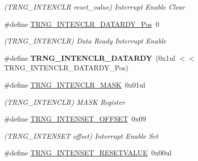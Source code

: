 \begin{DoxyCompactItemize}
\begin{DoxyCompactList}\small\item\em (T\+R\+N\+G\+\_\+\+I\+N\+T\+E\+N\+C\+L\+R reset\+\_\+value) Interrupt Enable Clear \end{DoxyCompactList}\item 
\hypertarget{group___s_a_m_l21___t_r_n_g_ga834c6df6c8e40b1c0e5215ede8b287ef}{}\#define \hyperlink{group___s_a_m_l21___t_r_n_g_ga834c6df6c8e40b1c0e5215ede8b287ef}{T\+R\+N\+G\+\_\+\+I\+N\+T\+E\+N\+C\+L\+R\+\_\+\+D\+A\+T\+A\+R\+D\+Y\+\_\+\+Pos}~0\label{group___s_a_m_l21___t_r_n_g_ga834c6df6c8e40b1c0e5215ede8b287ef}

\begin{DoxyCompactList}\small\item\em (T\+R\+N\+G\+\_\+\+I\+N\+T\+E\+N\+C\+L\+R) Data Ready Interrupt Enable \end{DoxyCompactList}\item 
\hypertarget{group___s_a_m_l21___t_r_n_g_ga0c7cb15f1dd74609e581e4ac9721471c}{}\#define {\bfseries T\+R\+N\+G\+\_\+\+I\+N\+T\+E\+N\+C\+L\+R\+\_\+\+D\+A\+T\+A\+R\+D\+Y}~(0x1ul $<$$<$ T\+R\+N\+G\+\_\+\+I\+N\+T\+E\+N\+C\+L\+R\+\_\+\+D\+A\+T\+A\+R\+D\+Y\+\_\+\+Pos)\label{group___s_a_m_l21___t_r_n_g_ga0c7cb15f1dd74609e581e4ac9721471c}

\item 
\hypertarget{group___s_a_m_l21___t_r_n_g_ga1cebdd4a126583db0a87ca4911bf4e6f}{}\#define \hyperlink{group___s_a_m_l21___t_r_n_g_ga1cebdd4a126583db0a87ca4911bf4e6f}{T\+R\+N\+G\+\_\+\+I\+N\+T\+E\+N\+C\+L\+R\+\_\+\+M\+A\+S\+K}~0x01ul\label{group___s_a_m_l21___t_r_n_g_ga1cebdd4a126583db0a87ca4911bf4e6f}

\begin{DoxyCompactList}\small\item\em (T\+R\+N\+G\+\_\+\+I\+N\+T\+E\+N\+C\+L\+R) M\+A\+S\+K Register \end{DoxyCompactList}\item 
\hypertarget{group___s_a_m_l21___t_r_n_g_ga82070f96a413cac3cc5f7964171e43ac}{}\#define \hyperlink{group___s_a_m_l21___t_r_n_g_ga82070f96a413cac3cc5f7964171e43ac}{T\+R\+N\+G\+\_\+\+I\+N\+T\+E\+N\+S\+E\+T\+\_\+\+O\+F\+F\+S\+E\+T}~0x09\label{group___s_a_m_l21___t_r_n_g_ga82070f96a413cac3cc5f7964171e43ac}

\begin{DoxyCompactList}\small\item\em (T\+R\+N\+G\+\_\+\+I\+N\+T\+E\+N\+S\+E\+T offset) Interrupt Enable Set \end{DoxyCompactList}\item 
\hypertarget{group___s_a_m_l21___t_r_n_g_gad570f735c53347793ff4007f59fce152}{}\#define \hyperlink{group___s_a_m_l21___t_r_n_g_gad570f735c53347793ff4007f59fce152}{T\+R\+N\+G\+\_\+\+I\+N\+T\+E\+N\+S\+E\+T\+\_\+\+R\+E\+S\+E\+T\+V\+A\+L\+U\+E}~0x00ul\label{group___s_a_m_l21___t_r_n_g_gad570f735c53347793ff4007f59fce152}


\end{DoxyCompactItemize}
